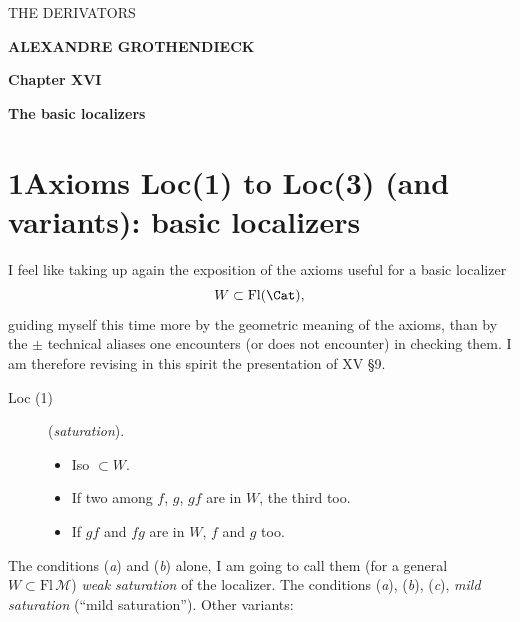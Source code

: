 
\begin{center}
{\sffamily\LARGE THE DERIVATORS}

\bigskip

{\large\textbf{ALEXANDRE GROTHENDIECK}}

\vspace{3em}

{\large\textbf{Chapter XVI}}

\medskip

{\large\textbf{The basic localizers}}
\end{center}

\clearpage



\clearpage



\section*{1\quad Axioms Loc(1) to Loc(3) (and variants): basic localizers}

I feel like taking up again the exposition of the axioms useful for a basic localizer
\[
W \subset \mathrm{Fl}(\Cat),
\]
guiding myself this time more by the geometric meaning of the axioms, than by the $\pm$ technical aliases one encounters (or does not encounter) in checking them. I am therefore revising in this spirit the presentation of XV §9.

\begin{description}
\item[Loc (1)] (\textit{saturation}).
\begin{itemize}
\item[\textit{a})] Iso $\subset W$.
\item[\textit{b})] If two among $f$, $g$, $gf$ are in $W$, the third too.
\item[\textit{c})] If $gf$ and $fg$ are in $W$, $f$ and $g$ too.
\end{itemize}
\end{description}

The conditions (\textit{a}) and (\textit{b}) alone, I am going to call them (for a general $W \subset \mathrm{Fl}\,\mathcal{M}$) \textit{weak saturation} of the localizer. The conditions (\textit{a}), (\textit{b}), (\textit{c}), \textit{mild saturation} (``mild saturation''). Other variants:

